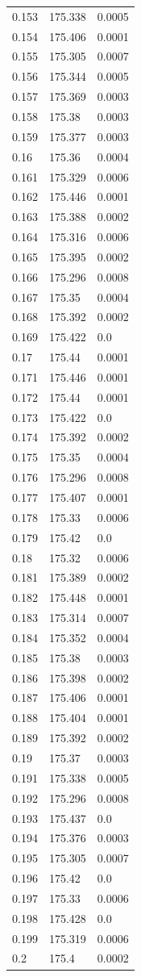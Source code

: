 \begin{table}[H]
\begin{tabular}{lll}
0.153 & 175.338 & 0.0005 \\
0.154 & 175.406 & 0.0001 \\
0.155 & 175.305 & 0.0007 \\
0.156 & 175.344 & 0.0005 \\
0.157 & 175.369 & 0.0003 \\
0.158 & 175.38 & 0.0003 \\
0.159 & 175.377 & 0.0003 \\
0.16 & 175.36 & 0.0004 \\
0.161 & 175.329 & 0.0006 \\
0.162 & 175.446 & 0.0001 \\
0.163 & 175.388 & 0.0002 \\
0.164 & 175.316 & 0.0006 \\
0.165 & 175.395 & 0.0002 \\
0.166 & 175.296 & 0.0008 \\
0.167 & 175.35 & 0.0004 \\
0.168 & 175.392 & 0.0002 \\
0.169 & 175.422 & 0.0 \\
0.17 & 175.44 & 0.0001 \\
0.171 & 175.446 & 0.0001 \\
0.172 & 175.44 & 0.0001 \\
0.173 & 175.422 & 0.0 \\
0.174 & 175.392 & 0.0002 \\
0.175 & 175.35 & 0.0004 \\
0.176 & 175.296 & 0.0008 \\
0.177 & 175.407 & 0.0001 \\
0.178 & 175.33 & 0.0006 \\
0.179 & 175.42 & 0.0 \\
0.18 & 175.32 & 0.0006 \\
0.181 & 175.389 & 0.0002 \\
0.182 & 175.448 & 0.0001 \\
0.183 & 175.314 & 0.0007 \\
0.184 & 175.352 & 0.0004 \\
0.185 & 175.38 & 0.0003 \\
0.186 & 175.398 & 0.0002 \\
0.187 & 175.406 & 0.0001 \\
0.188 & 175.404 & 0.0001 \\
0.189 & 175.392 & 0.0002 \\
0.19 & 175.37 & 0.0003 \\
0.191 & 175.338 & 0.0005 \\
0.192 & 175.296 & 0.0008 \\
0.193 & 175.437 & 0.0 \\
0.194 & 175.376 & 0.0003 \\
0.195 & 175.305 & 0.0007 \\
0.196 & 175.42 & 0.0 \\
0.197 & 175.33 & 0.0006 \\
0.198 & 175.428 & 0.0 \\
0.199 & 175.319 & 0.0006 \\
0.2 & 175.4 & 0.0002 \\
\bottomrule
\end{tabular}

\end{table}
